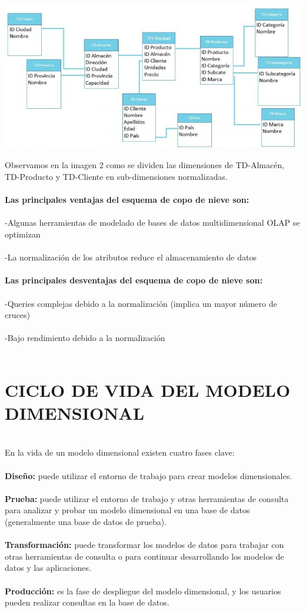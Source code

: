 \begin{center}
\includegraphics[width=15cm]{./Imagenes/imag2}
\end{center}
Observamos en la imagen 2 como se dividen las dimensiones de TD-Almacén, TD-Producto y TD-Cliente en sub-dimensiones normalizadas.\\\\
\textbf{Las principales ventajas del esquema de copo de nieve son:}\\\\
-Algunas herramientas de modelado de bases de datos multidimensional OLAP se optimizan\\\\
-La normalización de los atributos reduce el almacenamiento de datos\\\\
\textbf{Las principales desventajas del esquema de copo de nieve son:}\\\\
-Queries complejas debido a la normalización (implica un mayor número de cruces)\\\\
-Bajo rendimiento debido a la normalización\\\\
\section{CICLO DE VIDA DEL MODELO DIMENSIONAL}\\
En la vida de un modelo dimensional existen cuatro fases clave:\\\\
\textbf{Diseño:} puede utilizar el entorno de trabajo para crear modelos dimensionales.\\\\
\textbf{Prueba:} puede utilizar el entorno de trabajo y otras herramientas de consulta para analizar y probar un modelo dimensional en una base de datos (generalmente una base de datos de prueba).\\\\
\textbf{Transformación:} puede transformar los modelos de datos para trabajar con otras herramientas de consulta o para continuar desarrollando los modelos de datos y las aplicaciones.\\\\
\textbf{Producción:} es la fase de despliegue del modelo dimensional, y los usuarios pueden realizar consultas en la base de datos.


